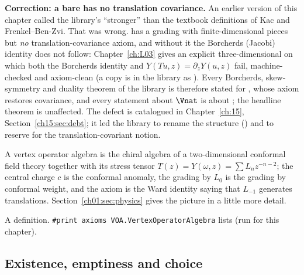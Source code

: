\begin{warning}
\textbf{Correction: a bare  has no translation covariance.} An earlier version
of this chapter called the library's  ``stronger'' than the textbook
definitions of Kac and Frenkel--Ben-Zvi. That was wrong.  has a grading with
finite-dimensional pieces but \emph{no} translation-covariance axiom, and without it the Borcherds
(Jacobi) identity does not follow: Chapter~\ref{ch:L03} gives an explicit three-dimensional
 on which both the Borcherds identity and $Y(Tu,z) = \partial_zY(u,z)$ fail,
machine-checked and axiom-clean (a copy is in the library as
).
Every Borcherds, skew-symmetry and duality theorem of the library is therefore stated for
, whose axiom  restores covariance, and every
statement about $\Vnat$ is about ; the headline theorem is unaffected.
The defect is catalogued in Chapter~\ref{ch:15}, Section~\ref{ch15:sec:debt}; it led the library to rename the structure () and to reserve  for the translation-covariant notion.
\end{warning}

\begin{physics}
A vertex operator algebra is the chiral algebra of a two-dimensional conformal field theory together
with its stress tensor $T(z) = Y(\omega,z) = \sum L_nz^{-n-2}$; the central charge $c$ is the
conformal anomaly, the grading by $L_0$ is the grading by conformal weight, and the axiom
 is the Ward identity saying that $L_{-1}$ generates translations.
Section~\ref{ch01:sec:physics} gives the picture in a little more detail.
\end{physics}

\begin{status}
A definition. \texttt{\#print axioms VOA.VertexOperatorAlgebra} lists
 (run for this chapter).
\end{status}

\subsection{Existence, emptiness and choice}\label{ch01:sec:choice}

